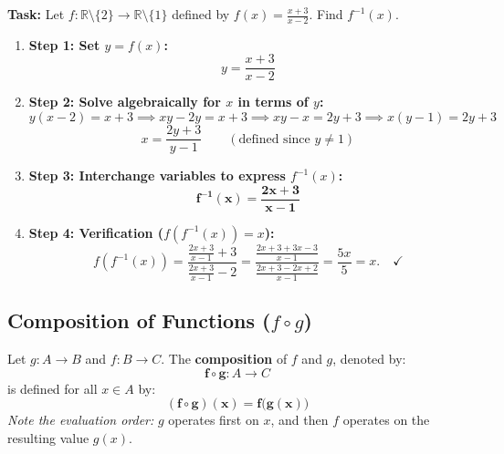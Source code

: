 \documentclass[11pt,a4paper]{article}
\begin{document}
\begin{examplebox}
\textbf{Task:} Let $f: \mathbb{R}\setminus\{2\} \to \mathbb{R}\setminus\{1\}$ defined by $f(x) = \frac{x + 3}{x - 2}$. Find $f^{-1}(x)$.
\begin{enumerate}
    \item \textbf{Step 1: Set $y = f(x)$:}
    \[
    y = \frac{x + 3}{x - 2}
    \]
    \item \textbf{Step 2: Solve algebraically for $x$ in terms of $y$:}
    \[
    y(x - 2) = x + 3 \implies xy - 2y = x + 3 \implies xy - x = 2y + 3 \implies x(y - 1) = 2y + 3
    \]
    \[
    x = \frac{2y + 3}{y - 1} \qquad (\text{defined since } y \neq 1)
    \]
    \item \textbf{Step 3: Interchange variables to express $f^{-1}(x)$:}
    \[
    \mathbf{f^{-1}(x) = \frac{2x + 3}{x - 1}}
    \]
    \item \textbf{Step 4: Verification ($f(f^{-1}(x)) = x$):}
    \[
    f(f^{-1}(x)) = \frac{\frac{2x+3}{x-1} + 3}{\frac{2x+3}{x-1} - 2} = \frac{\frac{2x+3+3x-3}{x-1}}{\frac{2x+3-2x+2}{x-1}} = \frac{5x}{5} = x. \quad \checkmark
    \]
\end{enumerate}
\end{examplebox}

\subsection{Composition of Functions (\texorpdfstring{$f \circ g$}{f o g})}

\begin{defbox}
Let $g: A \to B$ and $f: B \to C$. The \textbf{composition} of $f$ and $g$, denoted by:
\[
\mathbf{f \circ g}: A \to C
\]
is defined for all $x \in A$ by:
\[
\mathbf{(f \circ g)(x) = f\big(g(x)\big)}
\]
\textit{Note the evaluation order:} $g$ operates first on $x$, and then $f$ operates on the resulting value $g(x)$.
\end{defbox}

\begin{center}
\end{center}
\end{document}
